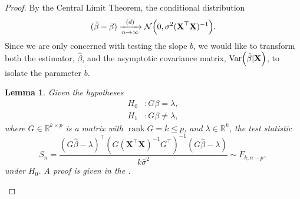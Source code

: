 \documentclass[letterpaper, reqno]{amsart}
\newtheorem{lemma}[theorem]{Lemma}
\numberwithin{equation}{section}
\newcommand{\T}{\top} %
\newcommand{\vect}[1]{\boldsymbol{\mathbf{#1}}} %
\newcommand{\Var}[1]{\operatorname{Var}\mleft(#1\mright)}
\newcommand{\R}{\mathbb{R}}  %
\newcommand{\N}[2]{\mathcal{N}\mleft( #1, #2 \mright)}
\newcommand{\Dlim}{\xrightarrow[n \to \infty]{(d)}}
\newcommand{\Xm}{\vect{X}}
\newcommand{\Bv}{\beta}
\newcommand{\Bvh}{\hat{\beta}}
\DeclareMathOperator{\rank}{rank}
\begin{document}
\begin{proof}
  By the Central Limit Theorem, the conditional distribution
  \[ (\Bvh - \Bv) \Dlim \N{0}{\sigma^2 (\Xm^\T\Xm)^{-1}}. \]
  Since we are only concerned with testing the slope $b$, we would like to
  transform both the estimator, $\Bvh$, and the asymptotic covariance matrix,
  $\Var{\Bvh|\Xm}$, to isolate the parameter $b$.
  \begin{lemma} \label{lem:F_test}
    Given the hypotheses
    \begin{align*}
      H_0 &\colon G\Bv = \lambda, \\
      H_1 &\colon G\Bv \ne \lambda,
    \end{align*}
    where $G \in \R^{k \times p}$ is a matrix with $\rank G = k \le p$, and
    $\lambda \in \R^k$, the test statistic
    \[ S_n = \frac{(G\Bvh - \lambda)^\T (G (\Xm^\T \Xm)^{-1} G^\T)^{-1} (G\Bvh - \lambda)}
      {k \hat{\sigma}^2} \sim F_{k, n-p},\]
    under $H_0$. A proof is given in the .
  \end{lemma}


\end{proof}
\end{document}
